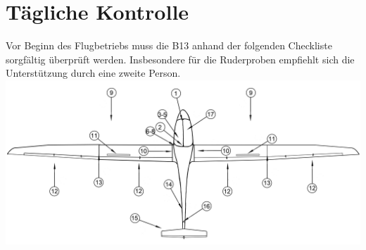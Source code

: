 \section{Tägliche Kontrolle}
Vor Beginn des Flugbetriebs muss die B13 anhand der folgenden Checkliste sorgfältig überprüft werden. Insbesondere für die Ruderproben empfiehlt sich die Unterstützung durch eine zweite Person.\\
\includegraphics[width=\textwidth]{b13check.png}
